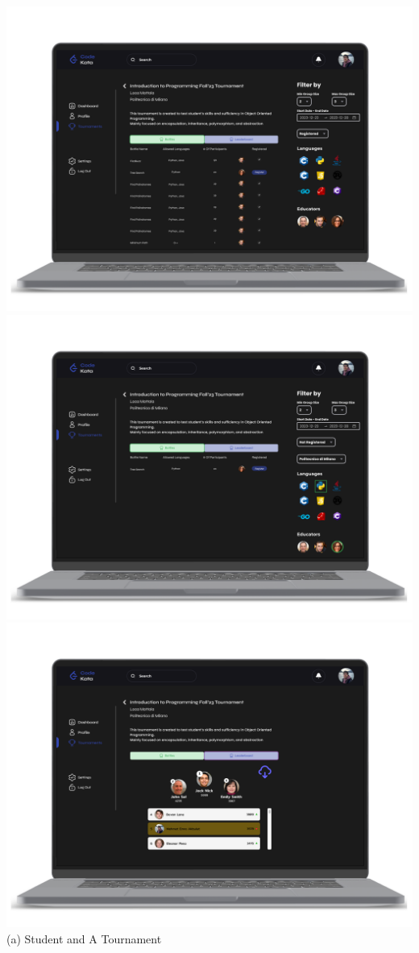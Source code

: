 \begin{center}
    \includegraphics[scale=0.13]{Images/ui-ux/student_tournament/student_tournament_1.png}
    \includegraphics[scale=0.13]{Images/ui-ux/student_tournament/student_tournament_2.png}    \includegraphics[scale=0.13]{Images/ui-ux/student_tournament/student_tournament_3.png} 
    \\ (a) Student and A Tournament
\end{center}
